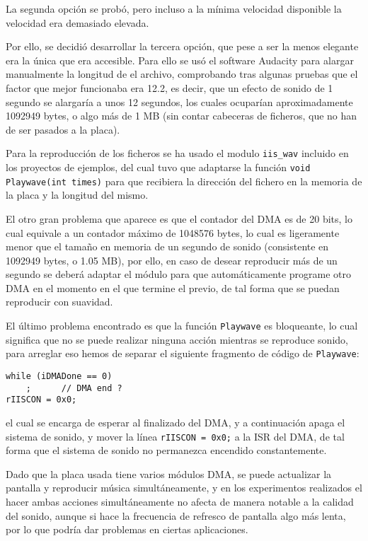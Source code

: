 \documentclass[12pt,letterpaper]{article}
\begin{document}
La segunda opción se probó, pero incluso a la mínima velocidad
disponible la velocidad era demasiado elevada.

Por ello, se decidió desarrollar la tercera opción, que pese a ser la
menos elegante era la única que era accesible. Para ello se usó el
software Audacity para alargar manualmente la longitud de el archivo,
comprobando tras algunas pruebas que el factor que mejor funcionaba
era 12.2, es decir, que un efecto de sonido de 1 segundo se alargaría
a unos 12 segundos, los cuales ocuparían aproximadamente 1092949
bytes, o algo más de 1 MB (sin contar cabeceras de ficheros, que no
han de ser pasados a la placa).

Para la reproducción de los ficheros se ha usado el modulo
\texttt{iis\_wav} incluido en los proyectos de ejemplos, del cual tuvo
que adaptarse la función \texttt{void Playwave(int times)} para que
recibiera la dirección del fichero en la memoria de la placa y la
longitud del mismo.

El otro gran problema que aparece es que el contador del DMA es de 20
bits, lo cual equivale a un contador máximo de 1048576 bytes, lo cual
es ligeramente menor que el tamaño en memoria de un segundo de sonido
(consistente en 1092949 bytes, o 1.05 MB), por ello, en caso de desear
reproducir más de un segundo se deberá adaptar el módulo para que
automáticamente programe otro DMA en el momento en el que termine el
previo, de tal forma que se puedan reproducir con suavidad.

El último problema encontrado es que la función \texttt{Playwave} es
bloqueante, lo cual significa que no se puede realizar ninguna acción
mientras se reproduce sonido, para arreglar eso hemos de separar el
siguiente fragmento de código de \texttt{Playwave}:
\lstset{language=C}
\begin{lstlisting}[frame=single]
while (iDMADone == 0)
	;      // DMA end ?
rIISCON = 0x0;
\end{lstlisting}
el cual se encarga de esperar al finalizado del DMA, y a continuación
apaga el sistema de sonido, y mover la línea \texttt{rIISCON = 0x0;} a
la ISR del DMA, de tal forma que el sistema de sonido no permanezca
encendido constantemente.

Dado que la placa usada tiene varios módulos DMA, se puede actualizar
la pantalla y reproducir música simultáneamente, y en los experimentos
realizados el hacer ambas acciones simultáneamente no afecta de manera
notable a la calidad del sonido, aunque si hace la frecuencia de
refresco de pantalla algo más lenta, por lo que podría dar problemas
en ciertas aplicaciones.
\end{document}
